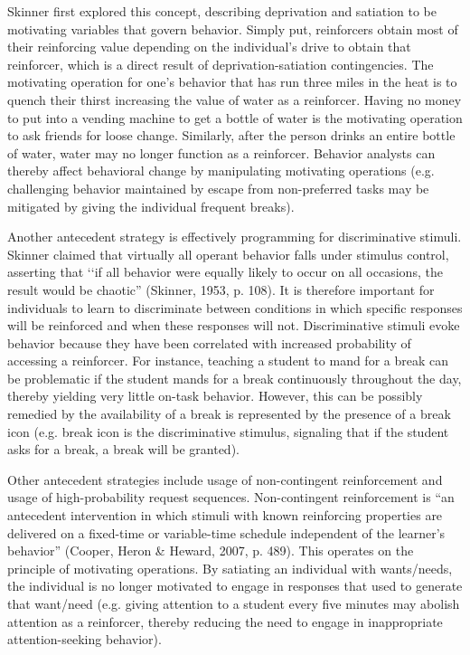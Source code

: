 Skinner first explored this concept, describing deprivation and satiation to be motivating variables that govern behavior. Simply put, reinforcers obtain most of their reinforcing value depending on the individual's drive to obtain that reinforcer, which is a direct result of deprivation-satiation contingencies. The motivating operation for one's behavior that has run three miles in the heat is to quench their thirst increasing the value of water as a reinforcer. Having no money to put into a vending machine to get a bottle of water is the motivating operation to ask friends for loose change. Similarly, after the person drinks an entire bottle of water, water may no longer function as a reinforcer. Behavior analysts can thereby affect behavioral change by manipulating motivating operations (e.g. challenging behavior maintained by escape from non-preferred tasks may be mitigated by giving the individual frequent breaks). 

Another antecedent strategy is effectively programming for discriminative stimuli. Skinner claimed that virtually all operant behavior falls under stimulus control, asserting that ‘‘if all behavior were equally likely to occur on all occasions, the result would be chaotic'' (Skinner, 1953, p. 108).  It is therefore important for individuals to learn to discriminate between conditions in which specific responses will be reinforced and when these responses will not. Discriminative stimuli evoke behavior because they have been correlated with increased probability of accessing a reinforcer. For instance, teaching a student to mand for a break can be problematic if the student mands for a break continuously throughout the day, thereby yielding very little on-task behavior. However, this can be possibly remedied by the availability of a break is represented by the presence of a break icon (e.g. break icon is the discriminative stimulus, signaling that if the student asks for a break, a break will be granted).  

Other antecedent strategies include usage of non-contingent reinforcement and usage of high-probability request sequences. Non-contingent reinforcement is ``an antecedent intervention in which stimuli with known reinforcing properties are delivered on a fixed-time or variable-time schedule independent of the learner's behavior'' (Cooper, Heron \& Heward, 2007, p. 489). This operates on the principle of motivating operations. By satiating an individual with wants/needs, the individual is no longer motivated to engage in responses that used to generate that want/need (e.g. giving attention to a student every five minutes may abolish attention as a reinforcer, thereby reducing the need to engage in inappropriate attention-seeking behavior). 
%
